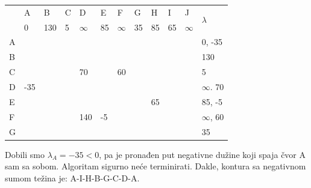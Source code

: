 \documentclass[12pt]{article}
\begin{document}
\begin{table}[hp]
\centering
\begin{tabular}{|l|l|l|l|l|l|l|l|l|l|l|l|}
\hline
\multirow{2}{*}{} & A & B & C & D & E & F & G & H & I & J & \multirow{2}{*}{$\lambda$} \\ \cline{2-11}
 & 0 & 130 & 5 & $\infty$ & 85 & $\infty$ & 35 & 85 & 65 & $\infty$ &  \\ \hline
A &  &  &  &  &  &  &  &  &  &  & 0, -35 \\ \hline
B &  &  &  &  &  &  &  &  &  &  & 130 \\ \hline
C &  &  &  & 70 &  & 60 &  &  &  &  & 5 \\ \hline
D & -35 &  &  &  &  &  &  &  &  &  & $\infty$. 70 \\ \hline
E &  &  &  &  &  &  &  & 65 &  &  & 85, -5 \\ \hline
F &  &  &  & 140 & -5 &  &  &  &  &  & $\infty$, 60 \\ \hline
G &  &  &  &  &  &  &  &  &  &  & 35 \\ \hline
\end{tabular}
\end{table}

Dobili smo $\lambda_A = -35 < 0$, pa je pronađen put negativne dužine koji spaja čvor A sam sa sobom. Algoritam sigurno neće terminirati. Dakle, kontura sa negativnom sumom težina je: A-I-H-B-G-C-D-A.
\end{document}
